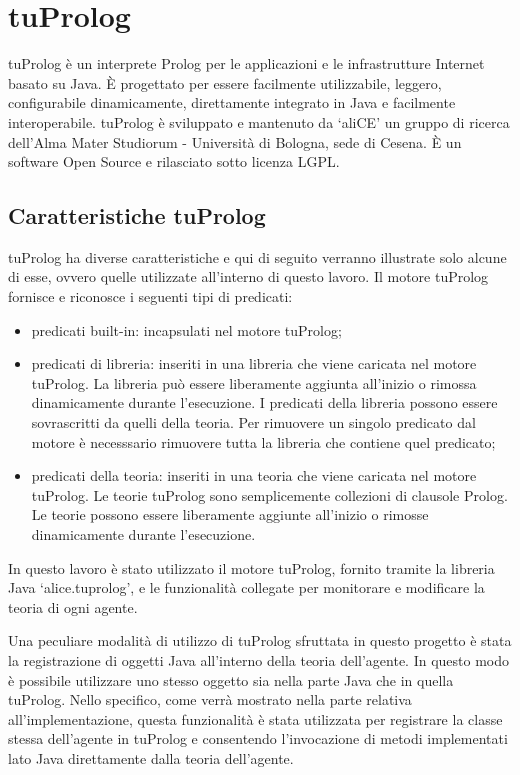 \section{tuProlog}
tuProlog \`e un interprete Prolog per le applicazioni e le infrastrutture Internet basato su Java. \`E progettato per essere facilmente utilizzabile, leggero, configurabile dinamicamente, direttamente integrato in Java e facilmente interoperabile.
tuProlog \`e sviluppato e mantenuto da `aliCE' un gruppo di ricerca dell'Alma Mater Studiorum - Universit\`a di Bologna, sede di Cesena. \`E un software Open Source e rilasciato sotto licenza LGPL.

\subsection{Caratteristiche tuProlog}
tuProlog ha diverse caratteristiche e qui di seguito verranno illustrate solo alcune di esse, ovvero quelle utilizzate all'interno di questo lavoro.
Il motore tuProlog fornisce e riconosce i seguenti tipi di predicati:
\begin{itemize}
\item predicati built-in: incapsulati nel motore tuProlog;
\item predicati di libreria: inseriti in una libreria che viene caricata nel motore tuProlog. La libreria pu\`o essere liberamente aggiunta all'inizio o rimossa dinamicamente durante l'esecuzione. I predicati della libreria possono essere sovrascritti da quelli della teoria. Per rimuovere un singolo predicato dal motore \`e necesssario rimuovere tutta la libreria che contiene quel predicato;
\item predicati della teoria: inseriti in una teoria che viene caricata nel motore tuProlog. Le teorie tuProlog sono semplicemente collezioni di clausole Prolog. Le teorie possono essere liberamente aggiunte all'inizio o rimosse dinamicamente durante l'esecuzione.
\end{itemize}

In questo lavoro \`e stato utilizzato il motore tuProlog, fornito tramite la libreria Java `alice.tuprolog', e le funzionalit\`a collegate per monitorare e modificare la teoria di ogni agente.

Una peculiare modalit\`a di utilizzo di tuProlog sfruttata in questo progetto \`e stata la registrazione di oggetti Java all'interno della teoria dell'agente. In questo modo \`e possibile utilizzare uno stesso oggetto sia nella parte Java che in quella tuProlog. Nello specifico, come verr\`a mostrato nella parte relativa all'implementazione, questa funzionalit\`a \`e stata utilizzata per registrare la classe stessa dell'agente in tuProlog e consentendo l'invocazione di metodi implementati lato Java direttamente dalla teoria dell'agente.

